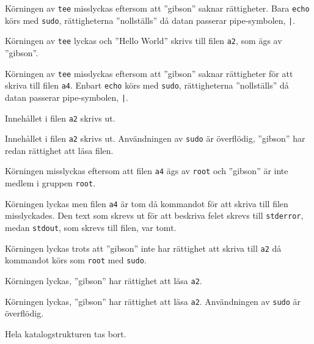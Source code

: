              {Körningen av \texttt{tee} misslyckas eftersom att ''gibson''
              saknar rättigheter. Bara \texttt{echo} körs med \texttt{sudo},
              rättigheterna ''nollställs'' då datan passerar pipe-symbolen,
              \texttt{|}.}

             {Körningen av \texttt{tee} lyckas och ''Hello World'' skrivs
              till filen \texttt{a2}, som ägs av ''gibson''.}

             {Körningen av \texttt{tee} misslyckas eftersom att ''gibson''
              saknar rättigheter för att skriva till filen \texttt{a4}. 
              Enbart \texttt{echo} körs med \texttt{sudo}, rättigheterna
              ''nollställs'' då datan passerar pipe-symbolen, \texttt{|}.}

             {Innehållet i filen \texttt{a2} skrivs ut.}

             {Innehållet i filen \texttt{a2} skrivs ut. Användningen av
              \texttt{sudo} är överflödig, ''gibson'' har redan rättighet att
              läsa filen.}

             {Körningen misslyckas eftersom att filen \texttt{a4} ägs av
              \texttt{root} och ''gibson'' är inte medlem i gruppen 
              \texttt{root}.}

             {Körningen lyckas men filen \texttt{a4} är tom då kommandot för
              att skriva till filen misslyckades. Den text som skrevs ut för
              att beskriva felet skrevs till \texttt{stderror}, medan 
              \texttt{stdout}, som skrevs till filen, var tomt.}

             {Körningen lyckas trots att ''gibson'' inte har rättighet att
              skriva till \texttt{a2} då kommandot körs som \texttt{root} med
              \texttt{sudo}.}

             {Körningen lyckas, ''gibson'' har rättighet att läsa \texttt{a2}.}

             {Körningen lyckas, ''gibson'' har rättighet att läsa \texttt{a2}.
              Användningen av \texttt{sudo} är överflödig.}

             {Hela katalogstrukturen tas bort.}
